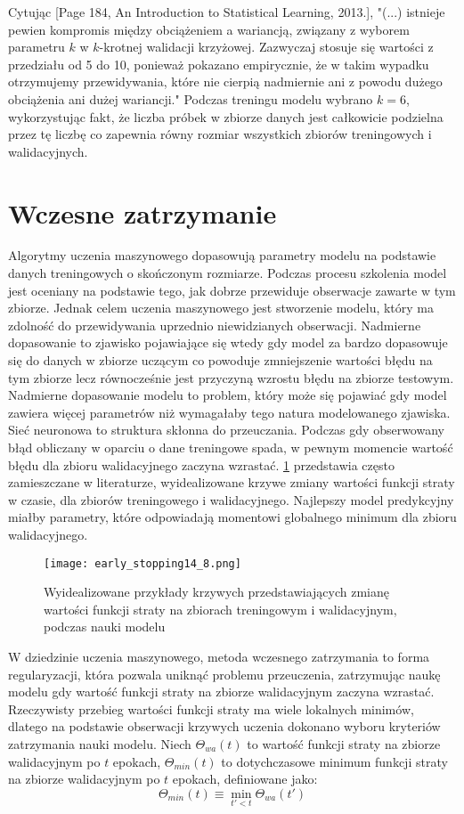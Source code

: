 \documentclass[]{article}
\theoremstyle{definition}
\begin{document}
Cytując [Page 184, An Introduction to Statistical Learning, 2013.], "(...) istnieje pewien kompromis między obciążeniem a wariancją, związany z wyborem parametru $k$ w $k$-krotnej walidacji krzyżowej. Zazwyczaj stosuje się wartości z przedziału od 5 do 10, ponieważ pokazano empirycznie, że w takim wypadku otrzymujemy przewidywania, które nie cierpią nadmiernie ani z powodu dużego obciążenia ani dużej wariancji." Podczas treningu modelu wybrano $k = 6$, wykorzystując fakt, że liczba próbek w zbiorze danych jest całkowicie podzielna przez tę liczbę co zapewnia równy rozmiar wszystkich zbiorów treningowych i walidacyjnych.

\section{Wczesne zatrzymanie}
Algorytmy uczenia maszynowego dopasowują parametry modelu na podstawie danych treningowych o skończonym rozmiarze. Podczas procesu szkolenia model jest oceniany na podstawie tego, jak dobrze przewiduje obserwacje zawarte w tym zbiorze. Jednak celem uczenia maszynowego jest stworzenie modelu, który ma zdolność do przewidywania uprzednio niewidzianych obserwacji. Nadmierne dopasowanie to zjawisko pojawiające się wtedy gdy model za bardzo dopasowuje się do danych w zbiorze uczącym co powoduje zmniejszenie wartości błędu na tym zbiorze lecz równocześnie jest przyczyną wzrostu błędu na zbiorze testowym. Nadmierne dopasowanie modelu to problem, który może się pojawiać gdy model zawiera więcej parametrów niż wymagałaby tego natura modelowanego zjawiska. Sieć neuronowa to struktura skłonna do przeuczania. Podczas gdy obserwowany błąd obliczany w oparciu o dane treningowe spada, w pewnym momencie wartość błędu dla zbioru walidacyjnego zaczyna wzrastać. \figurename{} \ref{fig:loss_curves} przedstawia często zamieszczane w literaturze, wyidealizowane krzywe zmiany wartości funkcji straty w czasie, dla zbiorów treningowego i walidacyjnego. Najlepszy model predykcyjny miałby parametry, które odpowiadają momentowi globalnego minimum dla zbioru walidacyjnego.


\begin{figure}[htp!]
	\centering
	\texttt{[image: early\_stopping14\_8.png]}
	\caption{Wyidealizowane przykłady krzywych przedstawiających zmianę wartości funkcji straty na zbiorach treningowym i walidacyjnym, podczas nauki modelu}
	\label{fig:loss_curves}
\end{figure}

W dziedzinie uczenia maszynowego, metoda wczesnego zatrzymania to forma regularyzacji, która pozwala uniknąć problemu przeuczenia, zatrzymując naukę modelu gdy wartość funkcji straty na zbiorze walidacyjnym zaczyna wzrastać. Rzeczywisty przebieg wartości funkcji straty ma wiele lokalnych minimów, dlatego na podstawie obserwacji krzywych uczenia dokonano wyboru kryteriów zatrzymania nauki modelu. 
 Niech $\Theta_{wa}(t)$ to wartość funkcji straty na zbiorze walidacyjnym po $t$ epokach, $\Theta_{min}(t)$ to dotychczasowe minimum funkcji straty na zbiorze walidacyjnym po $t$ epokach, definiowane jako:
 $$
 \Theta_{min}(t) \equiv \min_{t' < t} \Theta_{wa}(t')
 $$
 
\end{document}
